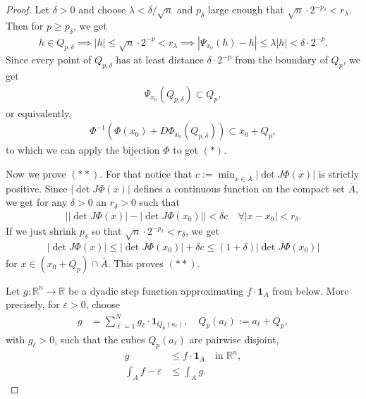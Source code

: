 \begin{proof}
	Let $\delta > 0$ and choose $\lambda < \delta / \sqrt{n}$ and $p_{\delta}$ large enough that $\sqrt{n} \cdot 2^{-p_{\delta}} < r_{\lambda}$. Then for $p \geq p_{\delta}$, we get
	\begin{align*}
		h \in Q_{p,\delta} \implies \left| h \right| \leq \sqrt{n}\cdot  2^{-p} < r_{\lambda} \implies \left| \Psi_{x_{0}}(h) - h \right| \leq \lambda \left| h \right| < \delta \cdot 2^{-p}.
	\end{align*}
	Since every point of $Q_{p,\delta}$ has at least distance $\delta \cdot 2^{-p}$ from the boundary of $Q_{p}$, we get
	\begin{align*}
		\Psi_{x_{0}}(Q_{p,\delta}) \subset Q_{p},
	\end{align*}
	or equivalently,
	\begin{align*}
		\Phi^{-1}(\Phi(x_{0}) + D \Phi_{x_{0}}(Q_{p, \delta})) \subset x_{0} + Q_{p},
	\end{align*}
	to which we can apply the bijection $\Phi$ to get $(*)$.

	Now we prove $(**)$. For that notice that $c := \min_{x \in \overline{ A } } \left| \det J \Phi(x) \right|$ is strictly positive. Since $\left| \det J \Phi(x) \right|$ defines a continuous function on the compact set $\overline{ A } $, we get for any $\delta > 0$ an $r_{\delta} > 0$ such that
	\begin{align*}
		\Big|  \left| \det J\Phi(x) \right|  - \left| \det J \Phi(x_{0}) \right| \Big| < \delta c \quad \forall \left| x - x_{0} \right| < r_{\delta}.
	\end{align*}
	If we just shrink $p_{\delta}$ so that $\sqrt{n} \cdot 2^{-p_{\delta}} < r_{\delta}$, we get
	\begin{align*}
		\left| \det J \Phi(x) \right| \leq \left| \det J \Phi(x_{0}) \right| + \delta c \leq (1+\delta) \left| \det J \Phi(x_{0}) \right|
	\end{align*}
	for $x \in (x_{0} + Q_{p}) \cap \overline{ A } $. This proves $(**)$.

	Let \( g : \mathbb{R}^n \to \mathbb{R} \) be a dyadic step function approximating \( f \cdot \mathbf{1}_A \) from below. More precisely, for \( \varepsilon > 0 \), choose
	\begin{align*}
		g & = \sum_{\ell=1}^N g_\ell \cdot \mathbf{1}_{Q_p(a_\ell)},
		\quad Q_p(a_\ell) := a_\ell + Q_p,
	\end{align*}
	with \( g_\ell > 0 \), such that the cubes \( Q_p(a_\ell) \) are pairwise disjoint,
	\begin{align*}
		g                      & \le f \cdot  \mathbf{1}_A \quad \text{in } \mathbb{R}^n, \\
		\int_A f - \varepsilon & \le \int_{A} g.
	\end{align*}


\end{proof}
